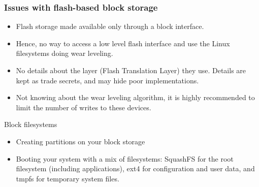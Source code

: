 \begin{frame}
  \frametitle{Issues with flash-based block storage}
  \begin{itemize}
  \item Flash storage made available only through a block interface.
  \item Hence, no way to access a low level flash interface
    and use the Linux filesystems doing wear leveling.
  \item No details about the layer (Flash Translation Layer) they
    use. Details are kept as trade secrets, and may hide poor
    implementations.
  \item Not knowing about the wear leveling algorithm, it is highly
    recommended to limit the number of writes to these devices.
  \end{itemize}
\end{frame}

\setuplabframe
{Block filesystems}
{
  \begin{itemize}
  \item Creating partitions on your block storage
  \item Booting your system with a mix of filesystems: SquashFS for
    the root filesystem (including applications), ext4 for
    configuration and user data, and tmpfs for
    temporary system files.
  \end{itemize}
}
